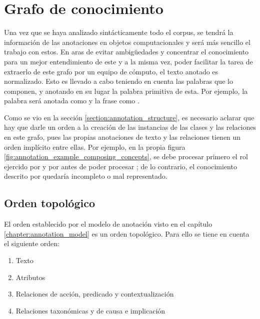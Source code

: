 \section{Grafo de conocimiento}
Una vez que se haya analizado sintácticamente todo el corpus, se tendrá la información de las anotaciones en objetos computacionales y será más sencillo el trabajo con estos. En aras de evitar ambigüedades y concentrar el conocimiento para un mejor entendimiento de este y a la misma vez, poder facilitar la tarea de extraerlo de este grafo por un equipo de cómputo, el texto anotado es normalizado. Esto es llevado a cabo teniendo en cuenta las palabras que lo componen, y anotando en su lugar la palabra primitiva de esta. Por ejemplo, la palabra  será anotada como  y la frase  como .

Como se vio en la sección \ref{section:annotation_structure}, es necesario aclarar que hay que darle un orden a la creación de las instancias de las clases y las relaciones en este grafo, pues las propias anotaciones de texto y las relaciones tienen un orden implícito entre ellas. Por ejemplo, en la propia figura \ref{fig:annotation_example_composing_concepts}, se debe procesar primero el rol ejercido por  y por  antes de poder procesar ; de lo contrario, el conocimiento descrito por  quedaría incompleto o mal representado.

\subsection{Orden topológico}
El orden establecido por el modelo de anotación visto en el capítulo \ref{chapter:annotation_model} es un orden topológico. Para ello se tiene en cuenta el siguiente orden:

\begin{enumerate}\label{enum:knowledge_graph_build_order}
	\vspace{-0.1in}
	\item Texto
	\vspace{-0.1in}
	\item Atributos
	\vspace{-0.1in}
	\item Relaciones de acción, predicado y contextualización
	\vspace{-0.1in}
	\item Relaciones taxonómicas y de causa e implicación
\end{enumerate}


